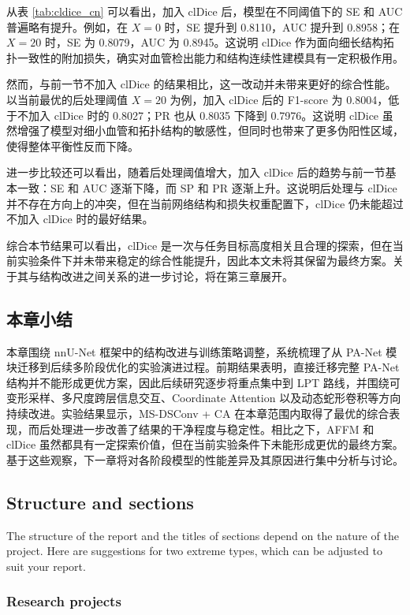\documentclass[a4paper,12pt]{article}
\begin{document}
从表 \ref{tab:cldice_cn} 可以看出，加入 clDice 后，模型在不同阈值下的 SE 和 AUC 普遍略有提升。例如，在 \(X=0\) 时，SE 提升到 0.8110，AUC 提升到 0.8958；在 \(X=20\) 时，SE 为 0.8079，AUC 为 0.8945。这说明 clDice 作为面向细长结构拓扑一致性的附加损失，确实对血管检出能力和结构连续性建模具有一定积极作用。

然而，与前一节不加入 clDice 的结果相比，这一改动并未带来更好的综合性能。以当前最优的后处理阈值 \(X=20\) 为例，加入 clDice 后的 F1-score 为 0.8004，低于不加入 clDice 时的 0.8027；PR 也从 0.8035 下降到 0.7976。这说明 clDice 虽然增强了模型对细小血管和拓扑结构的敏感性，但同时也带来了更多伪阳性区域，使得整体平衡性反而下降。

进一步比较还可以看出，随着后处理阈值增大，加入 clDice 后的趋势与前一节基本一致：SE 和 AUC 逐渐下降，而 SP 和 PR 逐渐上升。这说明后处理与 clDice 并不存在方向上的冲突，但在当前网络结构和损失权重配置下，clDice 仍未能超过不加入 clDice 时的最好结果。

综合本节结果可以看出，clDice 是一次与任务目标高度相关且合理的探索，但在当前实验条件下并未带来稳定的综合性能提升，因此本文未将其保留为最终方案。关于其与结构改进之间关系的进一步讨论，将在第三章展开。

\subsection{本章小结}

本章围绕 nnU-Net 框架中的结构改进与训练策略调整，系统梳理了从 PA-Net 模块迁移到后续多阶段优化的实验演进过程。前期结果表明，直接迁移完整 PA-Net 结构并不能形成更优方案，因此后续研究逐步将重点集中到 LPT 路线，并围绕可变形采样、多尺度跨层信息交互、Coordinate Attention 以及动态蛇形卷积等方向持续改进。实验结果显示，MS-DSConv + CA 在本章范围内取得了最优的综合表现，而后处理进一步改善了结果的干净程度与稳定性。相比之下，AFFM 和 clDice 虽然都具有一定探索价值，但在当前实验条件下未能形成更优的最终方案。基于这些观察，下一章将对各阶段模型的性能差异及其原因进行集中分析与讨论。

\subsection{Structure and sections}

The structure of the report and the titles of sections depend on the nature of the project. Here are suggestions for two extreme types, which can be adjusted to suit your report.

\subsubsection{Research projects}
\end{document}
